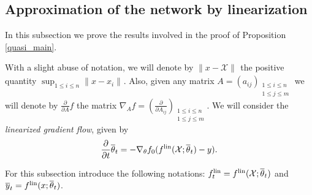 \documentclass{article}
\theoremstyle{definition}
\theoremstyle{remark}
\numberwithin{equation}{section}
\newcommand{\X}{\mathcal{X}}
\newcommand{\lin}{{\textup{lin}}}
\newcommand{\norm}[2]{
    \|#1\|_{#2}
}
\newcommand{\partv}[1]{
    \frac{\partial}{\partial #1}
}
\begin{document}
\subsection{Approximation of the network by linearization}

In this subsection we prove the results involved in the proof of Proposition \ref{quasi_main}.

With a slight abuse of notation, we will denote by $\norm{x-\X}{}$ the positive quantity $\sup_{1 \le i \le n}\norm{x-x_i}{}$.
Also, given any matrix $A = (a_{ij})_{\substack{1 \le i \le n \\1 \le j \le m}}$ we will denote by $\partv{A}f$ the matrix $\nabla_A f = (\partv{A_{ij}})_{\substack{1 \le i \le n \\1 \le j \le m}}$.
We will consider the \emph{linearized gradient flow}, given by
\[
    \frac{\partial}{\partial t} {\overline \theta_t} = -\nabla_\theta f_0 (f^\lin(\X;\overline \theta_t)-y).
\]

For this subsection introduce the following notations: $f^\lin_t =f^\lin(\X;\overline \theta_t)$ and $\overline y_t = f^\lin(x;\overline \theta_t)$.
\end{document}
